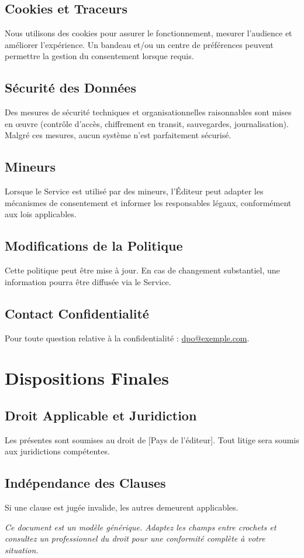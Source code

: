 \documentclass[12pt]{article}
\makeatletter
\newcommand{\Pays}{[Pays de l'éditeur]}
\newcommand{\ContactDPO}{dpo@exemple.com}
\makeatother
\begin{document}
\subsection{Cookies et Traceurs}
Nous utilisons des cookies pour assurer le fonctionnement, mesurer l'audience et améliorer l'expérience. Un bandeau et/ou un centre de préférences peuvent permettre la gestion du consentement lorsque requis.

\subsection{Sécurité des Données}
Des mesures de sécurité techniques et organisationnelles raisonnables sont mises en œuvre (contrôle d'accès, chiffrement en transit, sauvegardes, journalisation). Malgré ces mesures, aucun système n'est parfaitement sécurisé.

\subsection{Mineurs}
Lorsque le Service est utilisé par des mineurs, l'Éditeur peut adapter les mécanismes de consentement et informer les responsables légaux, conformément aux lois applicables.

\subsection{Modifications de la Politique}
Cette politique peut être mise à jour. En cas de changement substantiel, une information pourra être diffusée via le Service.

\subsection{Contact Confidentialité}
Pour toute question relative à la confidentialité : \href{mailto:\ContactDPO}{\ContactDPO}.

\section{Dispositions Finales}
\subsection{Droit Applicable et Juridiction}
Les présentes sont soumises au droit de \Pays{}. Tout litige sera soumis aux juridictions compétentes.

\subsection{Indépendance des Clauses}
Si une clause est jugée invalide, les autres demeurent applicables.

\vspace{2em}
\noindent\textit{Ce document est un modèle générique. Adaptez les champs entre crochets et consultez un professionnel du droit pour une conformité complète à votre situation.}
\end{document}
